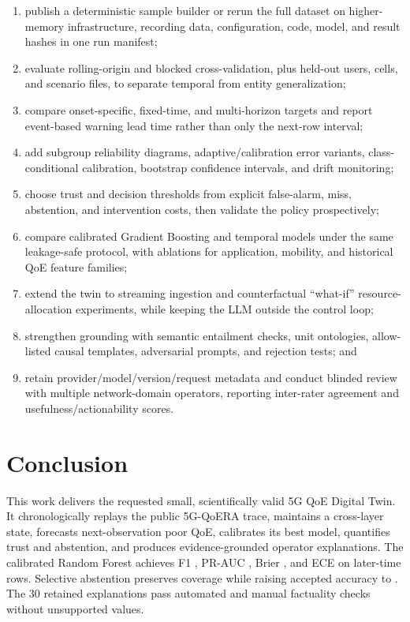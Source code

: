 \documentclass[10pt,conference]{IEEEtran}
\begin{document}
\begin{enumerate}
\item publish a deterministic sample builder or rerun the full dataset on
      higher-memory infrastructure, recording data, configuration, code, model,
      and result hashes in one run manifest;
\item evaluate rolling-origin and blocked cross-validation, plus held-out users,
      cells, and scenario files, to separate temporal from entity
      generalization;
\item compare onset-specific, fixed-time, and multi-horizon targets and report
      event-based warning lead time rather than only the next-row interval;
\item add subgroup reliability diagrams, adaptive/calibration error variants,
      class-conditional calibration, bootstrap confidence intervals, and drift
      monitoring;
\item choose trust and decision thresholds from explicit false-alarm, miss,
      abstention, and intervention costs, then validate the policy prospectively;
\item compare calibrated Gradient Boosting and temporal models under the same
      leakage-safe protocol, with ablations for application, mobility, and
      historical QoE feature families;
\item extend the twin to streaming ingestion and counterfactual ``what-if''
      resource-allocation experiments, while keeping the LLM outside the
      control loop;
\item strengthen grounding with semantic entailment checks, unit ontologies,
      allow-listed causal templates, adversarial prompts, and rejection tests;
      and
\item retain provider/model/version/request metadata and conduct blinded review
      with multiple network-domain operators, reporting inter-rater agreement
      and usefulness/actionability scores.
\end{enumerate}

\section{Conclusion}

This work delivers the requested small, scientifically valid 5G QoE Digital
Twin.  It chronologically replays the public 5G-QoERA trace, maintains a
cross-layer state, forecasts next-observation poor QoE, calibrates its best
model, quantifies trust and abstention, and produces evidence-grounded operator
explanations.  The calibrated Random Forest achieves F1 \RFFone, PR-AUC
\RFPRAUC, Brier \RFBrier, and ECE \RFECE on \TestRows later-time rows.
Selective abstention preserves \Coverage coverage while raising accepted
accuracy to \AcceptedAccuracy.  The 30 retained explanations pass automated
and manual factuality checks without unsupported values.
\end{document}

